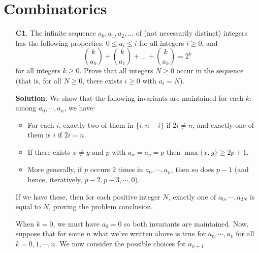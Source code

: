 \documentclass[11pt,a4paper]{article}
\begin{document}
\begin{enumerate}
\end{enumerate}

\section*{Combinatorics}
\begin{enumerate}
	\item [\textbf{C1}.] The infinite sequence $a_0,a _1, a_2, \dots$ of (not necessarily distinct) integers has the following properties: $0\le a_i \le i$ for all integers $i\ge 0$, and \[\binom{k}{a_0} + \binom{k}{a_1} + \dots + \binom{k}{a_k} = 2^k\]for all integers $k\ge 0$. Prove that all integers $N\ge 0$ occur in the sequence (that is, for all $N\ge 0$, there exists $i\ge 0$ with $a_i=N$).
	
	\textbf{Solution.} We show that the following invariants are maintained for each $k$: among $a_0, \cdots , a_n$, we have: 
	\begin{itemize}
		\item For each $i$, exactly two of them in $\{i, n-i\}$ if $2i\neq n$, and exactly one of them is $i$ if $2i=n$. 
		
		\item If there exists $x\neq y$ and $p$ with $a_x=a_y=p$ then $\max\{x, y\}\ge 2p+1$. 
		
		\item More generally, if $p$ occurs 2 times in $a_0, \cdots, a_n$, then so does $p-1$ (and hence, iteratively, $p-2, p-3, \cdots, 0$). 
	\end{itemize}
	If we have these, then for each positive integer $N$, exactly one of $a_0, \cdots, a_{2N}$ is equal to $N$, proving the problem conclusion. 
	
	When $k=0$, we must have $a_0=0$ so both invariants are maintained. Now, suppose that for some $n$ what we've written above is true for $a_0, \cdots , a_k$ for all $k=0, 1, \cdots , n$. We now consider the possible choices for $a_{n+1}$. 
	

\end{enumerate}
\end{document}
